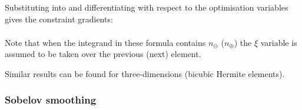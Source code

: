 Substituting  into
 and differentiating with respect to the optimisation
variables gives the constraint gradients:
\begin{eqnarray}
   \label{eqn:arclenjacline}
\end{eqnarray}

Note that when the integrand in these formula contains $n_{\ominus}$
($n_{\oplus}$) the $\xi$ variable is assumed to be taken over the previous
(next) element.

Similar results can be found for three-dimensions (\ie bicubic Hermite
elements).

\subsubsection{Sobelov smoothing}

